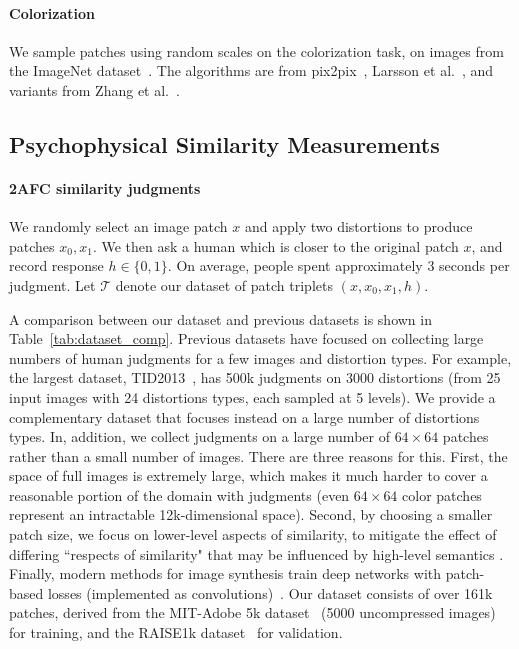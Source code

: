 \paragraph{Colorization} We sample patches using random scales on the colorization task, on images from the ImageNet dataset~\cite{russakovsky2015imagenet}. The algorithms are from pix2pix~\cite{isola2015learning}, Larsson et al.~\cite{larsson2016learning}, and variants from Zhang et al.~\cite{zhang2016colorful}.

\subsection{Psychophysical Similarity Measurements}

\paragraph{2AFC similarity judgments}
We randomly select an image patch $x$ and apply two distortions to produce patches $x_0, x_1$. We then ask a human which is closer to the original patch $x$, and record response $h \in \{0,1\}$. On average, people spent approximately 3 seconds per judgment. Let $\mathcal{T}$ denote our dataset of patch triplets $(x, x_0, x_1, h)$.

A comparison between our dataset and previous datasets is shown in Table~\ref{tab:dataset_comp}. 
Previous datasets have focused on collecting large numbers of human judgments for a few images and distortion types. 
For example, the largest dataset, TID2013~\cite{ponomarenko2015image}, has 500k judgments on 3000 distortions (from 25 input images with 24 distortions types, each sampled at 5 levels). 
We provide a complementary dataset that focuses instead on a large number of distortions types. In, addition, we collect judgments on a large number of $64\times 64$ patches rather than a small number of images.
There are three reasons for this. 
First, the space of full images is extremely large, which makes it much harder to cover a reasonable portion of the domain with judgments (even $64\times 64$ color patches represent an intractable 12k-dimensional space).
Second, by choosing a smaller patch size, we focus on lower-level aspects of similarity, to mitigate the effect of differing ``respects of similarity" that may be influenced by high-level semantics \cite{medin1993respects}. Finally, modern methods for image synthesis train deep networks with patch-based losses (implemented as convolutions)~\cite{chen2017photographic,isola2017image}. 
Our dataset consists of over 161k patches, derived from the MIT-Adobe 5k dataset~\cite{fivek} (5000 uncompressed images) for training, and the RAISE1k dataset~\cite{dang2015raise} for validation.

